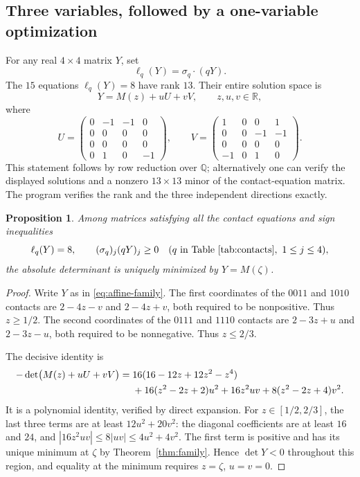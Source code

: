 \documentclass[11pt,reqno]{amsart}
\newtheorem{proposition}[theorem]{Proposition}
\theoremstyle{definition}
\newcommand{\R}{\mathbb R}
\newcommand{\Q}{\mathbb Q}
\begin{document}
\subsection{Three variables, followed by a one-variable optimization}
For any real $4\times4$ matrix $Y$, set
\[
 \ell_q(Y)=\sigma_q\cdot(qY).
\]
The $15$ equations $\ell_q(Y)=8$ have rank $13$. Their entire solution
space is
\begin{equation}\label{eq:affine-family}
 Y=M(z)+uU+vV,\qquad z,u,v\in\R,
\end{equation}
where
\[
 U=\begin{pmatrix}0&-1&-1&0\\0&0&0&0\\0&0&0&0\\0&1&0&-1\end{pmatrix},
 \qquad
 V=\begin{pmatrix}1&0&0&1\\0&0&-1&-1\\0&0&0&0\\-1&0&1&0\end{pmatrix}.
\]
This statement follows by row reduction over $\Q$; alternatively one
can verify the displayed solutions and a nonzero $13\times13$ minor
of the contact-equation matrix. The program verifies the rank and the
three independent directions exactly.

\begin{proposition}\label{prop:contact-opt}
Among matrices satisfying all the contact equations and sign inequalities
\[
 \ell_q(Y)=8,\qquad (\sigma_q)_j(qY)_j\ge0
 \quad(q\text{ in Table~\ref{tab:contacts}},\ 1\le j\le4),
\]
the absolute determinant is uniquely minimized by $Y=M(\zeta)$.
\end{proposition}
\begin{proof}
Write $Y$ as in \eqref{eq:affine-family}. The first coordinates of the
$0011$ and $1010$ contacts are $2-4z-v$ and $2-4z+v$, both required
to be nonpositive. Thus $z\ge1/2$. The second coordinates of the
$0111$ and $1110$ contacts are $2-3z+u$ and $2-3z-u$, both required
to be nonnegative. Thus $z\le2/3$.

The decisive identity is
\begin{align}\label{eq:main-identity}
 -\det\bigl(M(z)+uU+vV\bigr)
 ={}&16(16-12z+12z^2-z^4)\notag\\
 &+16(z^2-2z+2)u^2+16z^2uv
       +8(z^2-2z+4)v^2.
\end{align}
It is a polynomial identity, verified by direct expansion. For
$z\in[1/2,2/3]$, the last three terms are at least
$12u^2+20v^2$: the diagonal coefficients are at least $16$ and $24$,
and $|16z^2uv|\le8|uv|\le4u^2+4v^2$.
The first term is positive and has its unique minimum at $\zeta$ by
Theorem~\ref{thm:family}. Hence $\det Y<0$ throughout this region,
and equality at the minimum requires $z=\zeta$, $u=v=0$.
\end{proof}
\end{document}
